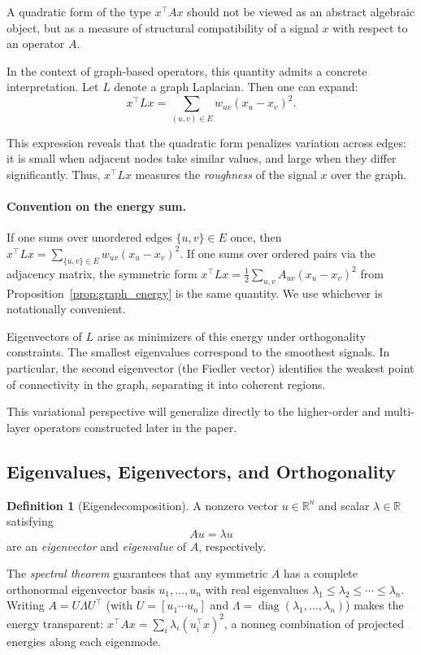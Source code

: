 \documentclass[11pt]{article}
\theoremstyle{definition}
\newtheorem{definition}[theorem]{Definition}
\theoremstyle{remark}
\newcommand{\R}{\mathbb{R}}
\DeclareMathOperator{\diag}{diag}
\begin{document}
A quadratic form of the type $x^\top A x$ should not be viewed as an abstract algebraic object, but as a measure of structural compatibility of a signal $x$ with respect to an operator $A$.

In the context of graph-based operators, this quantity admits a concrete interpretation. Let $L$ denote a graph Laplacian. Then one can expand:
\[
x^\top L x = \sum_{(u,v) \in E} w_{uv}(x_u - x_v)^2.
\]

This expression reveals that the quadratic form penalizes variation across edges: it is small when adjacent nodes take similar values, and large when they differ significantly. Thus, $x^\top L x$ measures the \emph{roughness} of the signal $x$ over the graph.

\paragraph{Convention on the energy sum.}
If one sums over unordered edges $\{u,v\}\in E$ once, then
$x^\top Lx = \sum_{\{u,v\}\in E} w_{uv}(x_u-x_v)^2$.
If one sums over ordered pairs via the adjacency matrix, the symmetric form
$x^\top Lx = \tfrac{1}{2}\sum_{u,v}A_{uv}(x_u-x_v)^2$ from Proposition~\ref{prop:graph_energy} is the same quantity. We use whichever is notationally convenient.

Eigenvectors of $L$ arise as minimizers of this energy under orthogonality constraints. The smallest eigenvalues correspond to the smoothest signals. In particular, the second eigenvector (the Fiedler vector) identifies the weakest point of connectivity in the graph, separating it into coherent regions.

This variational perspective will generalize directly to the higher-order and multi-layer operators constructed later in the paper.

\subsection{Eigenvalues, Eigenvectors, and Orthogonality}

\begin{definition}[Eigendecomposition]
A nonzero vector $u \in \R^n$ and scalar $\lambda \in \R$ satisfying
\[
  A u = \lambda u
\]
are an \emph{eigenvector} and \emph{eigenvalue} of $A$, respectively.
\end{definition}

The \emph{spectral theorem} guarantees that any symmetric $A$ has a complete
orthonormal eigenvector basis $u_1,\dots,u_n$ with real eigenvalues
$\lambda_1 \leq \lambda_2 \leq \cdots \leq \lambda_n$. Writing
$A = U\Lambda U^\top$ (with $U = [u_1 \cdots u_n]$ and $\Lambda =
\diag(\lambda_1,\dots,\lambda_n)$) makes the energy transparent:
$x^\top A x = \sum_i \lambda_i (u_i^\top x)^2$, a nonneg combination of
projected energies along each eigenmode.
\end{document}
